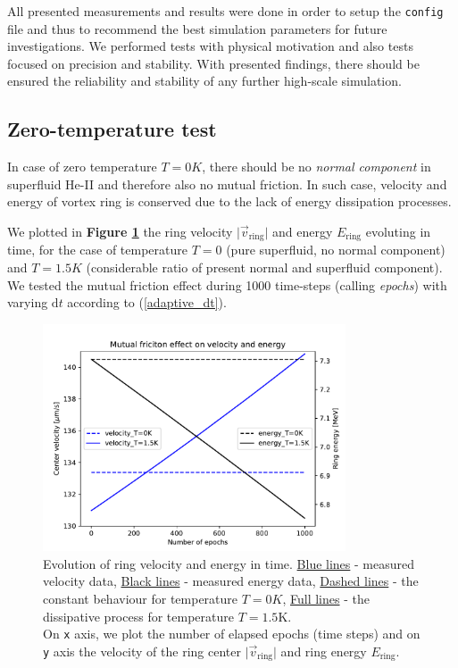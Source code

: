 All presented measurements and results were done in order to setup the \texttt{config} file and thus to recommend the best simulation parameters for future investigations. We performed tests with physical motivation and also tests focused on precision and stability. With presented findings, there should be ensured the reliability and stability of any further high-scale simulation.

\newpage


\subsection*{Zero-temperature test}

In case of zero temperature $T=0\unit{K}$, there should be no \textit{normal component} in superfluid He-II and therefore also no mutual friction. In such case, velocity and energy of vortex ring is conserved due to the lack of energy dissipation processes.

We plotted in \textbf{Figure \ref{Tzero}} the ring velocity $\vert \vec{v}_{\text{ring}} \vert $ and energy $E_{\text{ring}}$ evoluting in time, for the case of temperature $T=0$ (pure superfluid, no normal component) and $T=1.5\unit{K}$ (considerable ratio of present normal and superfluid component).\\ We tested the mutual friction effect during 1000 time-steps (calling \textit{epochs}) with varying $\text{d}t$ according to (\ref{adaptive_dt}).

\begin{figure}[h]
	\centering
	\includegraphics[width=0.8\textwidth]{graphics/results/Tzero}
	\caption{Evolution of ring velocity and energy in time. \underline{Blue lines} - measured velocity data, \underline{Black lines} - measured energy data,
	\underline{Dashed lines} - the constant behaviour for temperature $T=0\unit{K}$, \underline{Full lines} - the dissipative process for temperature $T=1.5\text{K}$.\\
	On \texttt{x} axis, we plot the number of elapsed epochs (time steps) and on \texttt{y} axis the velocity of the ring center $\vert \vec{v}_{\text{ring}} \vert $ and ring energy $E_{\text{ring}}$.}
	\label{Tzero}
\end{figure}

